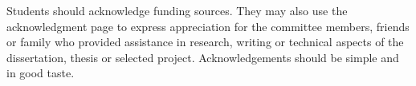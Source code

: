 \begin{acknowledgments}
Students should acknowledge funding sources. They may also use the
acknowledgment page to express appreciation for the committee members, friends
or family who provided assistance in research, writing or technical aspects of
the dissertation, thesis or selected project. Acknowledgements should be simple
and in good taste.
\end{acknowledgments}
